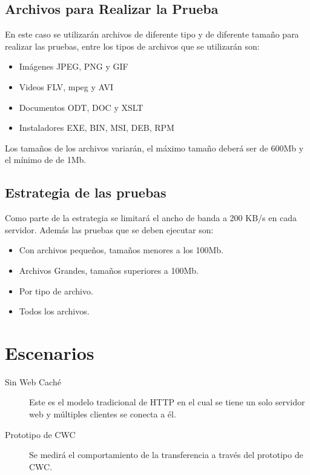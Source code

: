 \subsection{Archivos para Realizar la Prueba}
En este caso se utilizarán archivos de diferente tipo y de diferente tamaño para realizar las pruebas, entre los tipos de archivos que se utilizarán son:

\begin{itemize}
\item Imágenes JPEG, PNG y GIF
\item Videos FLV, mpeg y AVI
\item Documentos ODT, DOC y XSLT
\item Instaladores EXE, BIN, MSI, DEB, RPM
\end{itemize}

Los tamaños de los archivos variarán, el máximo tamaño deberá ser de 600Mb y el mínimo de de 1Mb.

\subsection{Estrategia de las pruebas}
Como parte de la estrategia se limitará el ancho de banda a 200 KB/s en cada servidor. Además las pruebas que se deben ejecutar son:

\begin{itemize}
\item Con archivos pequeños, tamaños menores a los 100Mb.
\item Archivos Grandes, tamaños superiores a 100Mb.
\item Por tipo de archivo.
\item Todos los archivos.
\end{itemize}

\section{Escenarios}

\begin{description}
\item[Sin Web Caché] Este es el modelo tradicional de HTTP en el cual se tiene un solo servidor web y múltiples clientes se conecta a él.

\item [Prototipo de CWC] Se medirá el comportamiento de la transferencia a través del prototipo de CWC.
\end{description}

